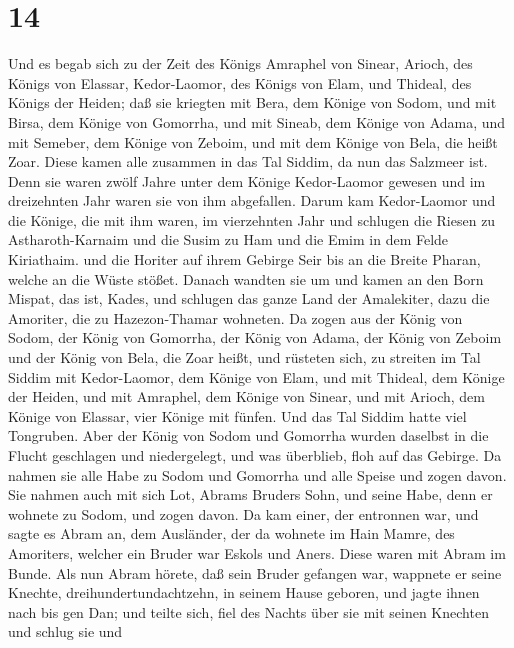 \hypertarget{section-13}{%
\section{14}\label{section-13}}

 Und es begab sich zu der Zeit des Königs Amraphel von
Sinear, Arioch, des Königs von Elassar, Kedor-Laomor, des Königs von
Elam, und Thideal, des Königs der Heiden;  daß sie kriegten
mit Bera, dem Könige von Sodom, und mit Birsa, dem Könige von Gomorrha,
und mit Sineab, dem Könige von Adama, und mit Semeber, dem Könige von
Zeboim, und mit dem Könige von Bela, die heißt Zoar.  Diese
kamen alle zusammen in das Tal Siddim, da nun das Salzmeer ist.
 Denn sie waren zwölf Jahre unter dem Könige Kedor-Laomor
gewesen und im dreizehnten Jahr waren sie von ihm abgefallen.
 Darum kam Kedor-Laomor und die Könige, die mit ihm waren,
im vierzehnten Jahr und schlugen die Riesen zu Astharoth-Karnaim und die
Susim zu Ham und die Emim in dem Felde Kiriathaim.  und die
Horiter auf ihrem Gebirge Seir bis an die Breite Pharan, welche an die
Wüste stößet.  Danach wandten sie um und kamen an den Born
Mispat, das ist, Kades, und schlugen das ganze Land der Amalekiter, dazu
die Amoriter, die zu Hazezon-Thamar wohneten.  Da zogen aus
der König von Sodom, der König von Gomorrha, der König von Adama, der
König von Zeboim und der König von Bela, die Zoar heißt, und rüsteten
sich, zu streiten im Tal Siddim  mit Kedor-Laomor, dem
Könige von Elam, und mit Thideal, dem Könige der Heiden, und mit
Amraphel, dem Könige von Sinear, und mit Arioch, dem Könige von Elassar,
vier Könige mit fünfen.  Und das Tal Siddim hatte viel
Tongruben. Aber der König von Sodom und Gomorrha wurden daselbst in die
Flucht geschlagen und niedergelegt, und was überblieb, floh auf das
Gebirge.  Da nahmen sie alle Habe zu Sodom und Gomorrha und
alle Speise und zogen davon.  Sie nahmen auch mit sich Lot,
Abrams Bruders Sohn, und seine Habe, denn er wohnete zu Sodom, und zogen
davon.  Da kam einer, der entronnen war, und sagte es Abram
an, dem Ausländer, der da wohnete im Hain Mamre, des Amoriters, welcher
ein Bruder war Eskols und Aners. Diese waren mit Abram im Bunde.
 Als nun Abram hörete, daß sein Bruder gefangen war,
wappnete er seine Knechte, dreihundertundachtzehn, in seinem Hause
geboren, und jagte ihnen nach bis gen Dan;  und teilte
sich, fiel des Nachts über sie mit seinen Knechten und schlug sie und
